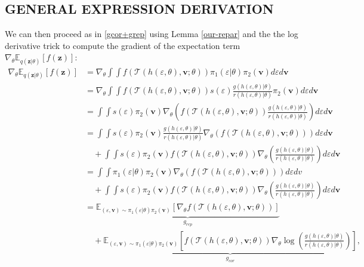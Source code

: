 \documentclass[letterpaper]{article}
\newcommand{\E}{\mathbb{E}}
\newcommand{\z}{\mathbf{z}}
\newcommand{\vv}{\mathbf{v}}
\begin{document}
\subsection{GENERAL EXPRESSION DERIVATION}
We can then proceed as in \ref{gcor+grep} using Lemma \ref{our-repar} and the the log derivative trick to compute the gradient of the expectation term $\nabla_{\theta}\E_{q(\z|\theta)}[f(\z)]$:
\begin{align}
    \nabla_{\theta}\E_{q(\z|\theta)}[f(\z)] &= \nabla_{\theta} \int\!\!\!\!\int f\left(\mathcal{T}(h(\varepsilon, \theta), \vv; \theta)\right) \pi_1(\varepsilon| \theta)\pi_2(\vv) d\varepsilon d\vv \\ 
    &=  \nabla_{\theta}\int\!\!\!\!\int f\left(\mathcal{T}(h(\varepsilon, \theta), \vv; \theta)\right) s(\varepsilon)\frac{g(h(\varepsilon,\theta)| \theta)}{r(h(\varepsilon,\theta)| \theta)}\pi_2(\vv) d\varepsilon d\vv \\ 
    &= \int\!\!\!\!\int s(\varepsilon)\pi_2(\vv) \nabla_{\theta}\left(f\left(\mathcal{T}(h(\varepsilon, \theta), \vv; \theta)\right) \frac{g(h(\varepsilon,\theta)| \theta)}{r(h(\varepsilon,\theta)| \theta)}\right) d\varepsilon d\vv \\
    &= \int\!\!\!\!\int s(\varepsilon)\pi_2(\vv) \frac{g(h(\varepsilon,\theta)| \theta)}{r(h(\varepsilon,\theta)| \theta)}\nabla_{\theta}\left(f\left(\mathcal{T}(h(\varepsilon, \theta), \vv; \theta)\right) \right) d\varepsilon d\vv \\
    & \quad +\int\!\!\!\!\int s(\varepsilon)\pi_2(\vv) f\left(\mathcal{T}(h(\varepsilon, \theta), \vv; \theta)\right)\nabla_{\theta}\left( \frac{g(h(\varepsilon,\theta)| \theta)}{r(h(\varepsilon,\theta)| \theta)}\right) d\varepsilon d\vv \nonumber  \\ 
    &= \int\!\!\!\!\int \pi_1(\varepsilon| \theta)\pi_2(\vv) \nabla_{\theta}\left(f\left(\mathcal{T}(h(\varepsilon, \theta), \vv; \theta)\right) \right) d\varepsilon dv 
    \\ 
    &\quad +\int\!\!\!\!\int s(\varepsilon)\pi_2(\vv) f\left(\mathcal{T}(h(\varepsilon, \theta), \vv; \theta)\right)\nabla_{\theta}\left( \frac{g(h(\varepsilon,\theta)| \theta)}{r(h(\varepsilon,\theta)| \theta)}\right) d\varepsilon d\vv \nonumber
    \\ 
    &= \underbrace{\E_{ (\varepsilon,\vv)\sim\pi_1(\varepsilon| \theta)\pi_2(\vv)} \left[\nabla_{\theta} f\left(\mathcal{T}(h(\varepsilon, \theta), \vv; \theta)\right)\right]}_{g_{rep}} \\
    & \quad + \underbrace{\E_{ (\varepsilon,\vv)\sim\pi_1(\varepsilon| \theta)\pi_2(\vv)} \left[ f\left(\mathcal{T}(h(\varepsilon, \theta), \vv; \theta)\right) \nabla_{\theta} \log\left( \frac{g(h(\varepsilon,\theta)| \theta)}{r(h(\varepsilon,\theta)| \theta)}\right) \right]}_{g_{cor}}, \nonumber 
\end{align}
\end{document}
